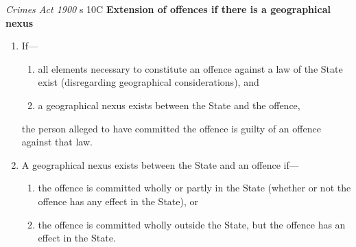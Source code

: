 \begin{statutedetails}{\textit{Crimes Act 1900} s 10C}
    \flushleft
    \textbf{Extension of offences if there is a geographical nexus}
    \begin{enumerate}[label=(\arabic*)]
        \item If—
        \begin{enumerate}[label=(\alph*)]
            \item all elements necessary to constitute an offence against a law of the State exist (disregarding geographical considerations), and
            \item a geographical nexus exists between the State and the offence,
        \end{enumerate}
        the person alleged to have committed the offence is guilty of an offence against that law.
        \item A geographical nexus exists between the State and an offence if—
        \begin{enumerate}[label=(\alph*)]
            \item the offence is committed wholly or partly in the State (whether or not the offence has any effect in the State), or
            \item the offence is committed wholly outside the State, but the offence has an effect in the State.
        \end{enumerate}
    \end{enumerate}
\end{statutedetails}

